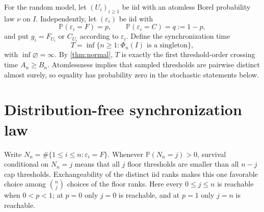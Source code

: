 \documentclass[11pt,a4paper]{amsart}
\theoremstyle{definition}
\theoremstyle{remark}
\newcommand{\Prob}{\mathbb P}
\begin{document}
For the random model, let $(U_i)_{i\geq1}$ be iid with an atomless Borel
probability law $\nu$ on $I$.  Independently, let $(\varepsilon_i)$ be iid
with
\begin{equation}\label{eq:type-law}
 \Prob(\varepsilon_i=F)=p,
 \qquad
 \Prob(\varepsilon_i=C)=q:=1-p,
\end{equation}
and put $g_i=F_{U_i}$ or $C_{U_i}$ according to $\varepsilon_i$.  Define
the synchronization time
\begin{equation}\label{eq:T}
 T=\inf\{n\geq1:\Phi_n(I)\text{ is a singleton}\},
\end{equation}
with $\inf\varnothing=\infty$.  By \cref{thm:normal}, $T$ is exactly the
first threshold-order crossing time $A_n\geq B_n$.  Atomlessness implies
that sampled thresholds are pairwise distinct almost surely, so equality
has probability zero in the stochastic statements below.

\section{Distribution-free synchronization law}
\label{sec:law}

Write $N_n=\#\{1\leq i\leq n:\varepsilon_i=F\}$.  Whenever
$\Prob(N_n=j)>0$, survival conditional on $N_n=j$ means that all $j$ floor
thresholds are smaller than all $n-j$ cap thresholds.  Exchangeability of
the distinct iid ranks makes this one favorable choice among $\binom nj$
choices of the floor ranks.  Here every $0\leq j\leq n$ is reachable when
$0<p<1$; at $p=0$ only $j=0$ is reachable, and at $p=1$ only $j=n$ is
reachable.
\end{document}
